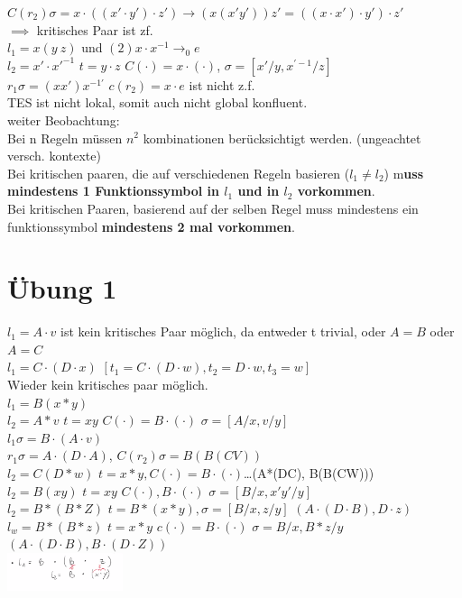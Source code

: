 \documentclass{article}
\begin{document}
	$C(r_2)\sigma = x\cdot ((x'\cdot y')\cdot z')\to (x(x'y'))z' = ((x\cdot x')\cdot y')\cdot z'$\\
	$\implies $ kritisches Paar ist zf.\\
	$l_1 =x(y\ z)$ und $(2) x\cdot x^{-1} \to_0 e$\\
	$l_2 = x'\cdot x'^{-1}$ $t=y\cdot z$ $C(\cdot)=x\cdot(\cdot)$, $\sigma = [x'/y, x^{'-1}/z]$\\
	$r_1\sigma = (xx')x^{-1'}$ $c(r_2) = x\cdot e$ ist nicht z.f.\\
	TES ist nicht lokal, somit auch nicht global konfluent.\\
	weiter Beobachtung:\\
	Bei n Regeln müssen $n^2$ kombinationen berücksichtigt werden. (ungeachtet versch. kontexte)\\
	Bei kritischen paaren, die auf verschiedenen Regeln basieren ($l_1\neq l_2$) m\textbf{uss mindestens 1 Funktionssymbol in $l_1$ und in $l_2$ vorkommen}.\\
	Bei kritischen Paaren, basierend auf der selben Regel muss mindestens ein funktionssymbol \textbf{mindestens 2 mal vorkommen}.\\
	\section{Übung 1}
	$l_1=A\cdot v$ ist kein kritisches Paar möglich, da entweder t trivial, oder $A=B$ oder $A=C$\\
	$l_1 =C\cdot (D\cdot x)$ $[t_1 = C\cdot (D\cdot w), t_2 = D\cdot w, t_3 = w]$\\
	Wieder kein kritisches paar möglich.\\
	$l_1 = B(x*y)$\\
	$l_2 = A*v$ $t=xy$ $C(\cdot) = B\cdot (\cdot)$ $\sigma =[A/x, v/y]$\\
	$l_1\sigma = B\cdot (A\cdot v)$\\
	$r_1\sigma = A\cdot (D\cdot A)$, $C(r_2)\sigma = B(B(CV))$\\
	$l_2 =C(D*w)$ $t=x*y, C(\cdot)=B\cdot (\cdot)$\dots (A*(DC), B(B(CW)))\\
	$l_2 =B(xy)$ $t=xy$ $C(\cdot), B\cdot(\cdot)$ $\sigma = [B/x, x'y'/y]$\\
	$l_2 = B*(B*Z)$ $t=B*(x*y), \sigma = [B/x,z/y]$ $(A\cdot (D\cdot B), D\cdot z)$\\
	$l_w = B*(B*z)$ $t=x*y$ $c(\cdot) = B\cdot (\cdot)$ $\sigma = B/x, B*z/y$\\
	$(A\cdot(D\cdot B), B\cdot(D\cdot Z))$\\
	\includegraphics[width=128px]{kompaktesCriticalPair.png}
\end{document}
